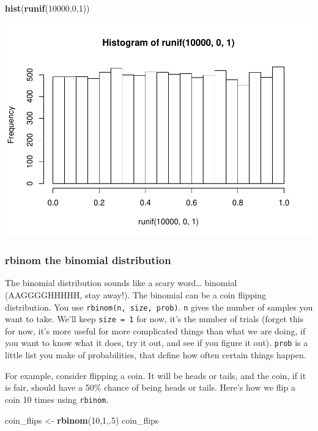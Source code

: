 \documentclass[]{book}
\newenvironment{Shaded}{\begin{snugshade}}{\end{snugshade}}
\newcommand{\KeywordTok}[1]{\textcolor[rgb]{0.13,0.29,0.53}{\textbf{#1}}}
\newcommand{\DecValTok}[1]{\textcolor[rgb]{0.00,0.00,0.81}{#1}}
\newcommand{\StringTok}[1]{\textcolor[rgb]{0.31,0.60,0.02}{#1}}
\newcommand{\NormalTok}[1]{#1}
\begin{document}
\begin{Shaded}
\begin{Highlighting}[]
\KeywordTok{hist}\NormalTok{(}\KeywordTok{runif}\NormalTok{(}\DecValTok{10000}\NormalTok{,}\DecValTok{0}\NormalTok{,}\DecValTok{1}\NormalTok{))}
\end{Highlighting}
\end{Shaded}

\includegraphics{Statistics_Lab_files/figure-latex/unnamed-chunk-109-1.pdf}

\subsubsection{rbinom the binomial
distribution}\label{rbinom-the-binomial-distribution}

The binomial distribution sounds like a scary word\ldots{} binomial
(AAGGGGHHHHH, stay away!). The binomial can be a coin flipping
distribution. You use \texttt{rbinom(n,\ size,\ prob)}. \texttt{n} gives
the number of samples you want to take. We'll keep \texttt{size\ =\ 1}
for now, it's the number of trials (forget this for now, it's more
useful for more complicated things than what we are doing, if you want
to know what it does, try it out, and see if you figure it out).
\texttt{prob} is a little list you make of probabilities, that define
how often certain things happen.

For example, consider flipping a coin. It will be heads or tails, and
the coin, if it is fair, should have a 50\% chance of being heads or
tails. Here's how we flip a coin 10 times using \texttt{rbinom}.

\begin{Shaded}
\begin{Highlighting}[]
\NormalTok{coin_flips <-}\StringTok{ }\KeywordTok{rbinom}\NormalTok{(}\DecValTok{10}\NormalTok{,}\DecValTok{1}\NormalTok{,.}\DecValTok{5}\NormalTok{)}
\NormalTok{coin_flips}
\end{Highlighting}
\end{Shaded}
\end{document}
